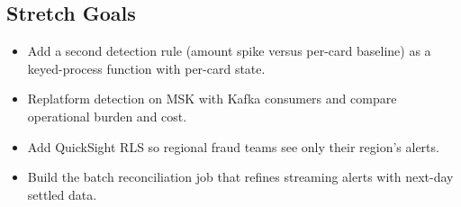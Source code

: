 \subsection*{Stretch Goals}
\begin{itemize}
    \item Add a second detection rule (amount spike versus per-card baseline) as a keyed-process function with per-card state.
    \item Replatform detection on MSK with Kafka consumers and compare operational burden and cost.
    \item Add QuickSight RLS so regional fraud teams see only their region's alerts.
    \item Build the batch reconciliation job that refines streaming alerts with next-day settled data.
\end{itemize}
